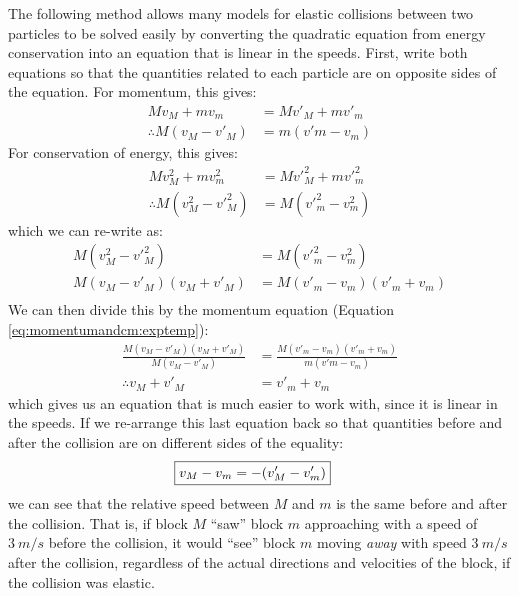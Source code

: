 \begin{example}
The following method allows many models for elastic collisions between two particles to be solved easily by converting the quadratic equation from energy conservation into an equation that is linear in the speeds. First, write both equations so that the quantities related to each particle are on opposite sides of the equation. For momentum, this gives:
\begin{align}
\label{eq:momentumandcm:exptemp}
Mv_M+mv_m&=Mv'_M+mv'_m\nonumber\\
\therefore M(v_M-v'_M) &= m(v'm-v_m)
\end{align}
For conservation of energy, this gives:
\begin{align*}
Mv_M^2+mv_m^2&=Mv'^2_M+mv'^2_m\\
\therefore  M(v_M^2-v'^2_M)&= M(v'^2_m-v^2_m)
\end{align*}
which we can re-write as:
\begin{align*}
M(v_M^2-v'^2_M)&= M(v'^2_m-v^2_m)\\
M(v_M-v'_M)(v_M+v'_M)&= M(v'_m-v_m)(v'_m+v_m)\\
\end{align*}
We can then divide this by the momentum equation (Equation \ref{eq:momentumandcm:exptemp}):
\begin{align*}
\frac{M(v_M-v'_M)(v_M+v'_M)}{M(v_M-v'_M)}&= \frac{M(v'_m-v_m)(v'_m+v_m)}{m(v'm-v_m)}\\
\therefore v_M+v'_M&=v'_m+v_m
\end{align*}
which gives us an equation that is much easier to work with, since it is linear in the speeds. If we re-arrange this last equation back so that quantities before and after the collision are on different sides of the equality:
\begin{align*}
\Aboxed{v_M-v_m &= - (v'_M-v'_m)}
\end{align*}
we can see that the relative speed between $M$ and $m$ is the same before and after the collision. That is, if block $M$ ``saw'' block $m$ approaching with a speed of $\SI{3}{m/s}$ before the collision, it would ``see'' block $m$ moving \textit{away} with speed $\SI{3}{m/s}$ after the collision, regardless of the actual directions and velocities of the block, if the collision was elastic.


\end{example}

